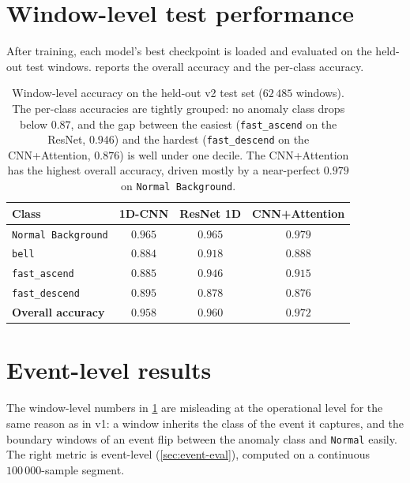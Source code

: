 \section{Window-level test performance}
\label{sec:res-window}

After training, each model's best checkpoint is loaded and evaluated
on the held-out test windows.  reports the
overall accuracy and the per-class accuracy.

\begin{table}[H]
    \centering
    \footnotesize
    \begin{tabular}{lccc}
        \toprule
        Class & \textbf{1D-CNN} & \textbf{ResNet 1D} & \textbf{CNN+Attention} \\
        \midrule
        \texttt{Normal Background} & $0.965$ & $0.965$ & $0.979$ \\
        \texttt{bell}              & $0.884$ & $0.918$ & $0.888$ \\
        \texttt{fast\_ascend}      & $0.885$ & $0.946$ & $0.915$ \\
        \texttt{fast\_descend}     & $0.895$ & $0.878$ & $0.876$ \\
        \midrule
        \textbf{Overall accuracy}  & $0.958$ & $0.960$ & $0.972$ \\
        \bottomrule
    \end{tabular}
    \caption{Window-level accuracy on the held-out v2 test set
    ($62\,485$ windows). The per-class accuracies are tightly grouped:
    no anomaly class drops below $0.87$, and the gap between the
    easiest (\texttt{fast\_ascend} on the ResNet, $0.946$) and the
    hardest (\texttt{fast\_descend} on the CNN+Attention, $0.876$) is
    well under one decile. The CNN+Attention has the highest overall
    accuracy, driven mostly by a near-perfect $0.979$ on
    \texttt{Normal Background}.}
    \label{tab:test-window}
\end{table}

\section{Event-level results}
\label{sec:res-event}

The window-level numbers in \cref{tab:test-window} are misleading at
the operational level for the same reason as in v1: a window inherits
the class of the event it captures, and the boundary windows of an
event flip between the anomaly class and \texttt{Normal} easily. The
right metric is event-level (\cref{sec:event-eval}), computed on a
continuous $100\,000$-sample segment.

